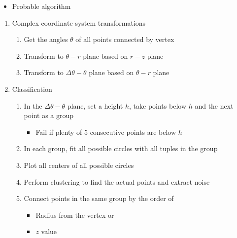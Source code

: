 \documentclass{article}
\begin{document}
\begin{itemize}
  \item Probable algorithm
\end{itemize}
\begin{enumerate}
\item Complex coordinate system transformations
  \begin{enumerate}
    \item Get the angles $\theta$ of all points connected by vertex
    \item Transform to $\theta - r$ plane based on $r-z$ plane
    \item Transform to $\Delta \theta - \theta$ plane based on $\theta - r$ plane
  \end{enumerate}
\item Classification
  \begin{enumerate}
    \item In the $\Delta\theta - \theta$ plane, set a height $h$, take points below $h$ and the next point as a group
      \begin{itemize}
        \item Fail if plenty of 5 consecutive points are below $h$
      \end{itemize}
    \item In each group, fit all possible circles with all tuples in the group
    \item Plot all centers of all possible circles
    \item Perform clustering to find the actual points and extract noise
    \item Connect points in the same group by the order of
      \begin{itemize}
        \item Radius from the vertex
         or 
        \item $z$ value
      \end{itemize}
  \end{enumerate}
\end{enumerate}
\end{document}
